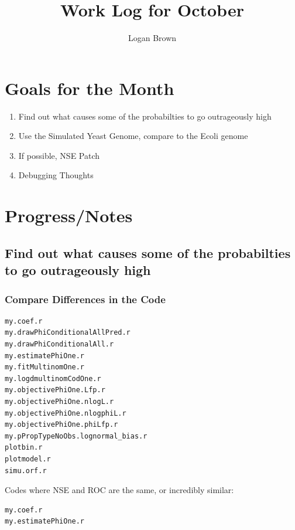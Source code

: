 

\title{Work Log for October}
\author{Logan Brown}



\maketitle
\tableofcontents

\newpage


\section{Goals for the Month}
\begin{enumerate}
\item Find out what causes some of the probabilties to go outrageously high
\item Use the Simulated Yeast Genome, compare to the Ecoli genome
\item If possible, NSE Patch
\item Debugging Thoughts
\end{enumerate}

\section{Progress/Notes}

\subsection{Find out what causes some of the probabilties to go outrageously high}

\subsubsection{Compare Differences in the Code}
\begin{verbatim}
my.coef.r
my.drawPhiConditionalAllPred.r
my.drawPhiConditionalAll.r
my.estimatePhiOne.r
my.fitMultinomOne.r
my.logdmultinomCodOne.r
my.objectivePhiOne.Lfp.r
my.objectivePhiOne.nlogL.r
my.objectivePhiOne.nlogphiL.r
my.objectivePhiOne.phiLfp.r
my.pPropTypeNoObs.lognormal_bias.r
plotbin.r
plotmodel.r
simu.orf.r
\end{verbatim}


Codes where NSE and ROC are the same, or incredibly similar:
\begin{verbatim}
my.coef.r
my.estimatePhiOne.r
\end{verbatim}

